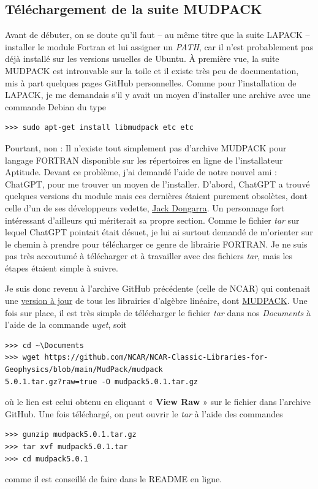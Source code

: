 \documentclass[10pt]{article}
\numberwithin{equation}{section}
\begin{document}
\subsection{Téléchargement de la suite MUDPACK}
\label{sec:orgf0b10fa}
Avant de débuter, on se doute qu'il faut -- au même titre que la suite LAPACK -- installer le module Fortran et lui assigner un \emph{PATH}, car il n'est probablement pas déjà installé sur les versions usuelles de Ubuntu.
À première vue, la suite MUDPACK est introuvable sur la toile et il existe très peu de documentation, mis à part quelques pages GitHub personnelles.
Comme pour l'installation de LAPACK, je me demandais s'il y avait un moyen d'installer une archive avec une commande Debian du type
\begin{verbatim}
>>> sudo apt-get install libmudpack etc etc
\end{verbatim}
Pourtant, non : Il n'existe tout simplement pas d'archive MUDPACK pour langage FORTRAN disponible sur les répertoires en ligne de l'installateur Aptitude.
Devant ce problème, j'ai demandé l'aide de notre nouvel ami : ChatGPT,  pour me trouver un moyen de l'installer.
D'abord, ChatGPT a trouvé quelques versions du module mais ces dernières étaient purement obsolètes, dont celle d'un de ses développeurs vedette, \href{https://netlib.org/utk/people/JackDongarra/}{Jack Dongarra}.
Un personnage fort intéressant d'ailleurs qui mériterait sa propre section.
Comme le fichier \emph{tar} sur lequel ChatGPT pointait était désuet, je lui ai surtout demandé de m'orienter sur le chemin à prendre pour télécharger ce genre de librairie FORTRAN.
Je ne suis pas très accoutumé à télécharger et à travailler avec des fichiers \emph{tar}, mais les étapes étaient simple à suivre.\newline

Je suis donc revenu à l'archive GitHub précédente (celle de NCAR) qui contenait une \href{https://github.com/NCAR/NCAR-Classic-Libraries-for-Geophysics}{version à jour}  de tous les librairies d'algèbre linéaire, dont \href{https://github.com/NCAR/NCAR-Classic-Libraries-for-Geophysics/tree/main/MudPack}{MUDPACK}.
Une fois sur place, il est très simple de télécharger le fichier \emph{tar} dans nos \emph{Documents} à l'aide de la commande \emph{wget}, soit
\begin{verbatim}
>>> cd ~\Documents
>>> wget https://github.com/NCAR/NCAR-Classic-Libraries-for-Geophysics/blob/main/MudPack/mudpack
5.0.1.tar.gz?raw=true -O mudpack5.0.1.tar.gz
\end{verbatim}
où le lien est celui obtenu en cliquant « \textbf{View Raw} » sur le fichier dans l'archive GitHub.
Une fois téléchargé, on peut ouvrir le \emph{tar} à l'aide des commandes
\begin{verbatim}
>>> gunzip mudpack5.0.1.tar.gz
>>> tar xvf mudpack5.0.1.tar
>>> cd mudpack5.0.1
\end{verbatim}
comme il est conseillé de faire dans le README en ligne.
\end{document}
